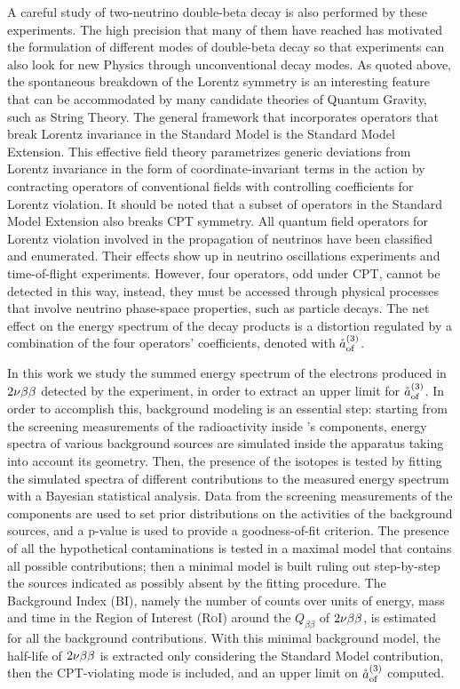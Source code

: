 	A careful study of two-neutrino double-beta decay is also performed by these experiments. The high precision that many of them have reached has motivated the formulation of different modes of double-beta decay so that experiments can also look for new Physics through unconventional decay modes. As quoted above, the spontaneous breakdown of the Lorentz symmetry is an interesting feature that can be accommodated by many candidate theories of Quantum Gravity, such as String Theory. The general framework that incorporates operators that break Lorentz invariance in the Standard Model is the Standard Model Extension. This effective field theory parametrizes generic deviations from Lorentz invariance in the form of coordinate-invariant terms in the action by contracting operators of conventional fields with controlling coefficients for Lorentz violation. It should be noted that a subset of operators in the Standard Model Extension also breaks CPT symmetry. All quantum field operators for Lorentz violation involved in the propagation of neutrinos have been classified and enumerated. Their effects show up in neutrino oscillations experiments and time-of-flight experiments. However, four operators, odd under CPT, cannot be detected in this way, instead, they must be accessed through physical processes that involve neutrino phase-space properties, such as particle decays. The net effect on the energy spectrum of the decay products is a distortion regulated by a combination of the four operators' coefficients, denoted with $\mathring{a}_\text{of}^{(3)}$.

	In this work we study the summed energy spectrum of the electrons produced in $2\nu\beta\beta$ detected by the {\gerda} experiment, in order to extract an upper limit for $\mathring{a}_\text{of}^{(3)}$. In order to accomplish this, background modeling is an essential step: starting from the screening measurements of the radioactivity inside {\gerda}’s components, energy spectra of various background sources are simulated inside the apparatus taking into account its geometry. Then, the presence of the isotopes is tested by fitting the simulated spectra of different contributions to the measured energy spectrum with a Bayesian statistical analysis. Data from the screening measurements of the {\gerda} components are used to set prior distributions on the activities of the background sources, and a p-value is used to provide a goodness-of-fit criterion. The presence of all the hypothetical contaminations is tested in a maximal model that contains all possible contributions; then a minimal model is built ruling out step-by-step the sources indicated as possibly absent by the fitting procedure. The Background Index (BI), namely the number of counts over units of energy, mass and time in the Region of Interest (\textsc{RoI}) around the $Q_{\beta\beta}$ of $2\nu\beta\beta$, is estimated for all the background contributions. With this minimal background model, the half-life of $2\nu\beta\beta$ is extracted only considering the Standard Model contribution, then the CPT-violating mode is included, and an upper limit on $\mathring{a}_\text{of}^{(3)}$ computed.

